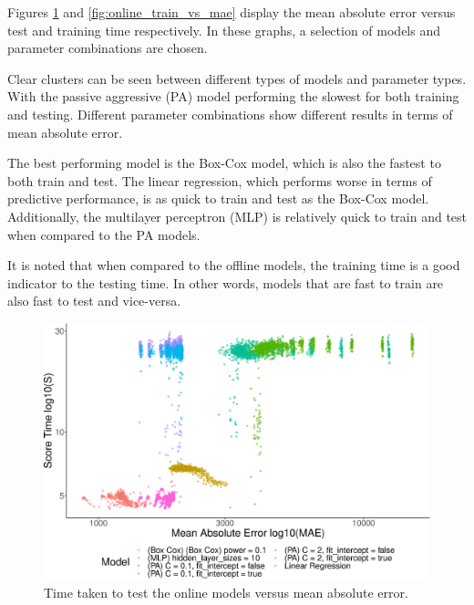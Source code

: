 \documentclass[final,3p,times,twocolumn,numbers]{elsarticle}
\begin{document}
Figures \ref{fig:online_test_vs_mae} and \ref{fig:online_train_vs_mae} display the mean absolute error versus test and training time respectively. In these graphs, a selection of models and parameter combinations are chosen. 

Clear clusters can be seen between different types of models and parameter types. With the passive aggressive (PA) model performing the slowest for both training and testing. Different parameter combinations show different results in terms of mean absolute error.

The best performing model is the Box-Cox model, which is also the fastest to both train and test. The linear regression, which performs worse in terms of predictive performance, is as quick to train and test as the Box-Cox model. Additionally, the multilayer perceptron (MLP) is relatively quick to train and test when compared to the PA models. 

It is noted that when compared to the offline models, the training time is a good indicator to the testing time. In other words, models that are fast to train are also fast to test and vice-versa.




\begin{figure}[h]
\centering
\includegraphics[width=\columnwidth]{figures/results/online_testing_time_vs_mae_all_results_opaque.eps}
\caption{Time taken to test the online models versus mean absolute error.}
\label{fig:online_test_vs_mae}
\end{figure}
\end{document}
